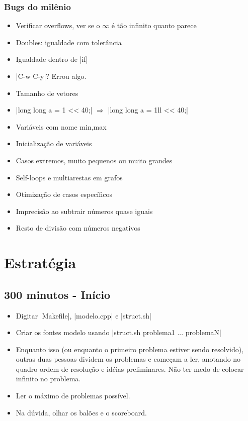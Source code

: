 \documentclass[oneside, landscape, twocolumn, a4wide, 9pt]{scrartcl}
\begin{document}
\subsubsection{Bugs do milênio}
\begin{itemize}
\item Verificar overflows, ver se o $\infty$ é tão infinito quanto parece
\item Doubles: igualdade com tolerância
\item Igualdade dentro de |if|
\item |C-w C-y|? Errou algo.
\item Tamanho de vetores
\item |long long a = 1 << 40;| $\Longrightarrow$ |long long a = 1ll << 40;| %
\item Variáveis com nome min,max
\item Inicialização de variáveis
\item Casos extremos, muito pequenos ou muito grandes
\item Self-loops e multiarestas em grafos
\item Otimização de casos específicos
\item Imprecisão ao subtrair números quase iguais
\item Resto de divisão com números negativos
\end{itemize}

\section{Estratégia}
\subsection{300 minutos - Início}
\begin{itemize}
\item Digitar |Makefile|, |modelo.cpp| e |struct.sh|
\item Criar os fontes modelo usando |struct.sh problema1 ... problemaN|
\item Enquanto isso (ou enquanto o primeiro problema estiver sendo
  resolvido), outras duas pessoas dividem os problemas e começam a
  ler, anotando no quadro ordem de resolução e idéias
  preliminares. Não ter medo de colocar infinito no problema.
\item Ler o máximo de problemas possível.
\item Na dúvida, olhar os balões e o scoreboard.
\end{itemize}
\end{document}
